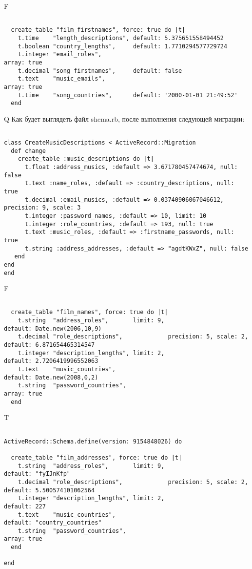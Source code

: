 F
\begin{verbatim}

  create_table "film_firstnames", force: true do |t|
    t.time    "length_descriptions", default: 5.375651558494452
    t.boolean "country_lengths",     default: 1.7710294577729724
    t.integer "email_roles",                                                      array: true
    t.decimal "song_firstnames",     default: false
    t.text    "music_emails",                                                     array: true
    t.time    "song_countries",      default: '2000-01-01 21:49:52'
  end

\end{verbatim}

Q
Как будет выглядеть файл shema.rb, после выполнения следующей миграции:

\begin{verbatim}

class CreateMusicDescriptions < ActiveRecord::Migration 
  def change 
    create_table :music_descriptions do |t| 
      t.float :address_musics, :default => 3.671780457474674, null: false
      t.text :name_roles, :default => :country_descriptions, null: true
      t.decimal :email_musics, :default => 0.03740906067046612, precision: 9, scale: 3
      t.integer :password_names, :default => 10, limit: 10
      t.integer :role_countries, :default => 193, null: true
      t.text :music_roles, :default => :firstname_passwords, null: true
      t.string :address_addresses, :default => "agdtKWxZ", null: false
   end
end
end
\end{verbatim}

F
\begin{verbatim}

  create_table "film_names", force: true do |t|
    t.string  "address_roles",       limit: 9,                         default: Date.new(2006,10,9)
    t.decimal "role_descriptions",             precision: 5, scale: 2, default: 6.871654465314547
    t.integer "description_lengths", limit: 2,                         default: 2.7206419996552063
    t.text    "music_countries",                                       default: Date.new(2008,0,2)
    t.string  "password_countries",                                                                  array: true
  end

\end{verbatim}

T
\begin{verbatim}

ActiveRecord::Schema.define(version: 9154848026) do

  create_table "film_addresses", force: true do |t|
    t.string  "address_roles",       limit: 9,                         default: "fyIJnKfp"
    t.decimal "role_descriptions",             precision: 5, scale: 2, default: 5.500574101062564
    t.integer "description_lengths", limit: 2,                         default: 227
    t.text    "music_countries",                                       default: "country_countries"
    t.string  "password_countries",                                                                  array: true
  end

end
\end{verbatim}



